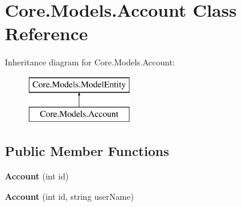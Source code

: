 \hypertarget{classCore_1_1Models_1_1Account}{\section{Core.\-Models.\-Account Class Reference}
\label{classCore_1_1Models_1_1Account}
}
Inheritance diagram for Core.\-Models.\-Account\-:\begin{figure}[H]
\begin{center}
\leavevmode
\includegraphics[height=2.000000cm]{classCore_1_1Models_1_1Account}
\end{center}
\end{figure}
\subsection*{Public Member Functions}
\begin{DoxyCompactItemize}
\item 
\hypertarget{classCore_1_1Models_1_1Account_a6142601e9f18c6453a95ebde6d8cfec3}{{\bfseries Account} (int id)}\label{classCore_1_1Models_1_1Account_a6142601e9f18c6453a95ebde6d8cfec3}

\item 
\hypertarget{classCore_1_1Models_1_1Account_acb6bb3a9e0def84b5f944891937eb173}{{\bfseries Account} (int id, string user\-Name)}\label{classCore_1_1Models_1_1Account_acb6bb3a9e0def84b5f944891937eb173}

\end{DoxyCompactItemize}

